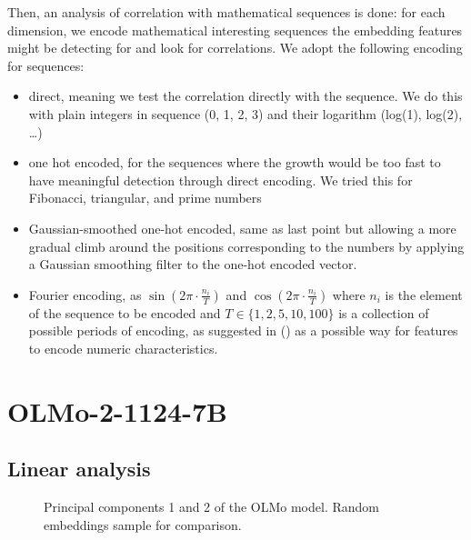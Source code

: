 \documentclass[
  a4paper, twoside, 10pt, titlepage]{book}
\makeatletter
\newcommand*\pandocbounded[1]{%
  \sbox\pandoc@box{#1}%
  \Gscale@div\@tempa{\textheight}{\dimexpr\ht\pandoc@box+\dp\pandoc@box\relax}%
  \Gscale@div\@tempb{\linewidth}{\wd\pandoc@box}%
  \ifdim\@tempb\p@<\@tempa\p@\let\@tempa\@tempb\fi%
  \ifdim\@tempa\p@<\p@\scalebox{\@tempa}{\usebox\pandoc@box}%
  \else\usebox{\pandoc@box}%
  \fi%
}
\makeatother
\begin{document}
Then, an analysis of correlation with mathematical sequences is done:
for each dimension, we encode mathematical interesting sequences the
embedding features might be detecting for and look for correlations. We
adopt the following encoding for sequences:

\begin{itemize}
\item
  direct, meaning we test the correlation directly with the sequence. We
  do this with plain integers in sequence (0, 1, 2, 3) and their
  logarithm (log(1), log(2), \ldots)
\item
  one hot encoded, for the sequences where the growth would be too fast
  to have meaningful detection through direct encoding. We tried this
  for Fibonacci, triangular, and prime numbers
\item
  Gaussian-smoothed one-hot encoded, same as last point but allowing a
  more gradual climb around the positions corresponding to the numbers
  by applying a Gaussian smoothing filter to the one-hot encoded vector.
\item
  Fourier encoding, as \(\sin\left(2 \pi  \cdot \frac{n_i}T\right)\) and
  \(\cos\left(2 \pi
  \cdot \frac{n_i}T\right)\) where \(n_i\) is the element of the
  sequence to be encoded and \(T \in \{1, 2, 5, 10, 100\}\) is a
  collection of possible periods of encoding, as suggested in
  () as a
  possible way for features to encode numeric characteristics.
\end{itemize}

\clearpage

\section{OLMo-2-1124-7B}\label{olmo-2-1124-7b}

\subsection{Linear analysis}\label{linear-analysis}

\begin{figure}
\centering
\pandocbounded{}
\caption{Principal components 1 and 2 of the OLMo model. Random
embeddings sample for comparison.}\label{fig:olmo-pca}
\end{figure}
\end{document}
